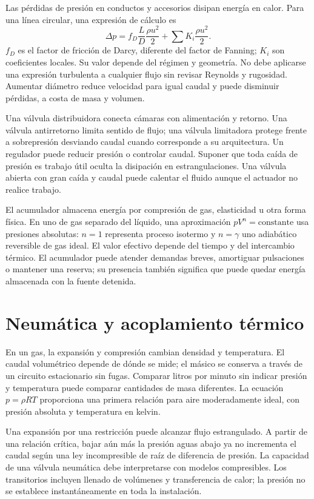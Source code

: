 Las pérdidas de presión en conductos y accesorios disipan energía en calor. Para una línea circular, una expresión de cálculo es
\begin{equation}
 \Delta p=f_D\frac{L}{D}\frac{\rho u^2}{2}
 +\sum K_i\frac{\rho u^2}{2}.
\end{equation}
$f_D$ es el factor de fricción de Darcy, diferente del factor de Fanning; $K_i$ son coeficientes locales. Su valor depende del régimen y geometría. No debe aplicarse una expresión turbulenta a cualquier flujo sin revisar Reynolds y rugosidad. Aumentar diámetro reduce velocidad para igual caudal y puede disminuir pérdidas, a costa de masa y volumen.

Una válvula distribuidora conecta cámaras con alimentación y retorno. Una válvula antirretorno limita sentido de flujo; una válvula limitadora protege frente a sobrepresión desviando caudal cuando corresponde a su arquitectura. Un regulador puede reducir presión o controlar caudal. Suponer que toda caída de presión es trabajo útil oculta la disipación en estrangulaciones. Una válvula abierta con gran caída y caudal puede calentar el fluido aunque el actuador no realice trabajo.

El acumulador almacena energía por compresión de gas, elasticidad u otra forma física. En uno de gas separado del líquido, una aproximación $pV^n=\mathrm{constante}$ usa presiones absolutas: $n=1$ representa proceso isotermo y $n=\gamma$ uno adiabático reversible de gas ideal. El valor efectivo depende del tiempo y del intercambio térmico. El acumulador puede atender demandas breves, amortiguar pulsaciones o mantener una reserva; su presencia también significa que puede quedar energía almacenada con la fuente detenida.

\section{Neumática y acoplamiento térmico}
En un gas, la expansión y compresión cambian densidad y temperatura. El caudal volumétrico depende de dónde se mide; el másico se conserva a través de un circuito estacionario sin fugas. Comparar litros por minuto sin indicar presión y temperatura puede comparar cantidades de masa diferentes. La ecuación $p=\rho RT$ proporciona una primera relación para aire moderadamente ideal, con presión absoluta y temperatura en kelvin.

Una expansión por una restricción puede alcanzar flujo estrangulado. A partir de una relación crítica, bajar aún más la presión aguas abajo ya no incrementa el caudal según una ley incompresible de raíz de diferencia de presión. La capacidad de una válvula neumática debe interpretarse con modelos compresibles. Los transitorios incluyen llenado de volúmenes y transferencia de calor; la presión no se establece instantáneamente en toda la instalación.

